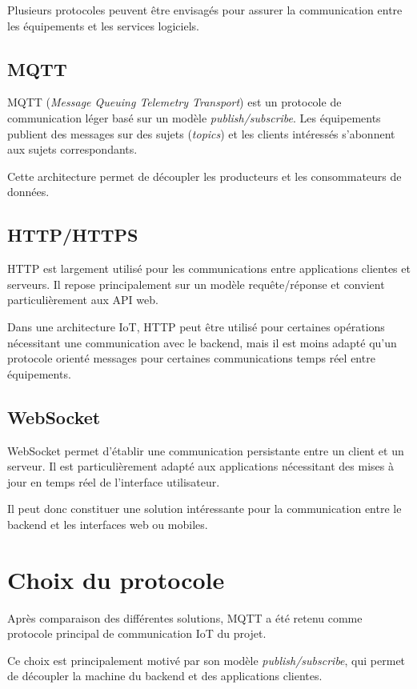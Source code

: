 Plusieurs protocoles peuvent être envisagés pour assurer la communication
entre les équipements et les services logiciels.

\subsection{MQTT}

MQTT (\textit{Message Queuing Telemetry Transport}) est un protocole de
communication léger basé sur un modèle \textit{publish/subscribe}. Les
équipements publient des messages sur des sujets (\textit{topics}) et les
clients intéressés s'abonnent aux sujets correspondants.

Cette architecture permet de découpler les producteurs et les
consommateurs de données.

\subsection{HTTP/HTTPS}

HTTP est largement utilisé pour les communications entre applications
clientes et serveurs. Il repose principalement sur un modèle
requête/réponse et convient particulièrement aux API web.

Dans une architecture IoT, HTTP peut être utilisé pour certaines
opérations nécessitant une communication avec le backend, mais il est
moins adapté qu'un protocole orienté messages pour certaines
communications temps réel entre équipements.

\subsection{WebSocket}

WebSocket permet d'établir une communication persistante entre un client
et un serveur. Il est particulièrement adapté aux applications nécessitant
des mises à jour en temps réel de l'interface utilisateur.

Il peut donc constituer une solution intéressante pour la communication
entre le backend et les interfaces web ou mobiles.

\section{Choix du protocole}

Après comparaison des différentes solutions, MQTT a été retenu comme
protocole principal de communication IoT du projet.

Ce choix est principalement motivé par son modèle
\textit{publish/subscribe}, qui permet de découpler la machine du backend
et des applications clientes.

